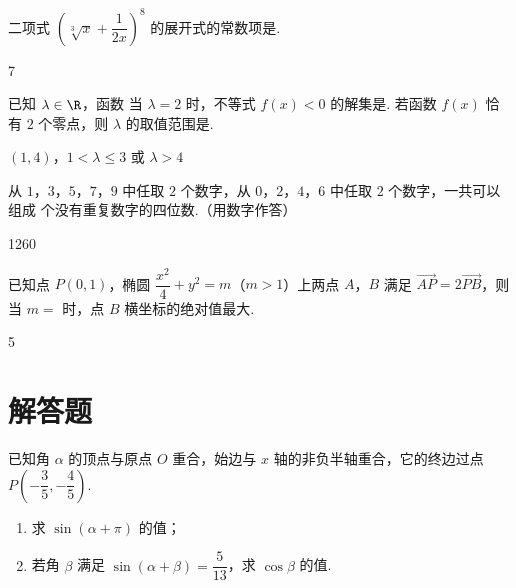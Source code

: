 \begin{problem}
二项式 \(\left(\sqrt[3]{x}+\dfrac{1}{2x}\right)^8\) 的展开式的常数项是\fillinblank{}.
\end{problem}

\begin{answer}
7
\end{answer}

\begin{problem}
已知 \(\lambda\in\R\)，函数
当 \(\lambda=2\) 时，不等式 \(f(x)<0\) 的解集是\fillinblank{}. 若函数 \(f(x)\) 恰有 \(2\) 个零点，则 \(\lambda\) 的取值范围是\fillinblank{}.
\end{problem}

\begin{answer}
\((1,4)\)，\(1<\lambda\le3\) 或 \(\lambda>4\)
\end{answer}

\begin{problem}
从 \(1\)，\(3\)，\(5\)，\(7\)，\(9\) 中任取 \(2\) 个数字，从 \(0\)，\(2\)，\(4\)，\(6\) 中任取 \(2\) 个数字，一共可以组成\fillinblank{} 个没有重复数字的四位数.（用数字作答）
\end{problem}

\begin{answer}
1260
\end{answer}

\begin{problem}
已知点 \(P(0,1)\)，椭圆 \(\dfrac{x^2}{4}+y^2=m\)（\(m>1\)）上两点 \(A\)，\(B\) 满足 \(\overrightarrow{AP}=2\overrightarrow{PB}\)，则当 \(m=\)\fillinblank{} 时，点 \(B\) 横坐标的绝对值最大.
\end{problem}

\begin{answer}
5
\end{answer}

\section{解答题}

\begin{problem}
已知角 \(\alpha\) 的顶点与原点 \(O\) 重合，始边与 \(x\) 轴的非负半轴重合，它的终边过点 \(P\left(-\dfrac35,-\dfrac45\right)\).

\begin{enumerate}
  \item 求 \(\sin(\alpha+\pi)\) 的值；
  \item 若角 \(\beta\) 满足 \(\sin(\alpha+\beta)=\dfrac{5}{13}\)，求 \(\cos\beta\) 的值.
\end{enumerate}
\end{problem}

